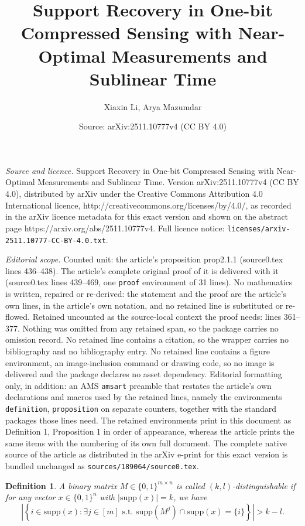 \documentclass[10pt,a4paper]{amsart}
\title{Support Recovery in One-bit Compressed Sensing with Near-Optimal Measurements and Sublinear Time}
\author{Xiaxin Li, Arya Mazumdar}
\date{Source: arXiv:2511.10777v4 (CC BY 4.0)}
\newtheorem{definition}{Definition}
\newcommand{\supp}{\mathrm{supp}}
\begin{document}
\maketitle

\noindent\emph{Source and licence.} Support Recovery in One-bit Compressed Sensing with Near-Optimal Measurements and Sublinear Time. Version arXiv:2511.10777v4 (CC BY 4.0), distributed by arXiv under the Creative Commons Attribution 4.0 International licence, http://creativecommons.org/licenses/by/4.0/, as recorded in the arXiv licence metadata for this exact version and shown on the abstract page https://arxiv.org/abs/2511.10777v4. Full licence notice: \texttt{licenses/arxiv-2511.10777-CC-BY-4.0.txt}.\par\smallskip

\noindent\textit{Editorial scope.} Counted unit: the article's proposition prop2.1.1 (source0.tex lines 436--438). The article's complete original proof of it is delivered with it (source0.tex lines 439--469, one \texttt{proof} environment of 31 lines). No mathematics is written, repaired or re-derived: the statement and the proof are the article's own lines, in the article's own notation, and no retained line is substituted or re-flowed.  Retained uncounted as the source-local context the proof needs: lines 361--377.  Nothing was omitted from any retained span, so the package carries no omission record.  No retained line contains a citation, so the wrapper carries no bibliography and no bibliography entry.  No retained line contains a figure environment, an image-inclusion command or drawing code, so no image is delivered and the package declares no asset dependency.  Editorial formatting only, in addition: an AMS \texttt{amsart} preamble that restates the article's own declarations and macros used by the retained lines, namely the environments \texttt{definition}, \texttt{proposition} on separate counters, together with the standard packages those lines need.  The retained environments print in this document as Definition 1, Proposition 1 in order of appearance, whereas the article prints the same items with the numbering of its own full document.  The complete native source of the article as distributed in the arXiv e-print for this exact version is bundled unchanged as \texttt{sources/189064/source0.tex}.
\begin{definition}\label{def:kld}
A binary matrix $M \in \{0,1\}^{m \times n}$ is called $(k,l)$-\emph{distinguishable} if for any vector $x \in \{0,1\}^n$ with $|\supp(x)| = k$, we have
\[
\left| \left\{ i \in \supp(x) : \exists j \in [m] \text{ s.t. } \supp(M^j) \cap \supp(x) = \{i\} \right\} \right| > k - l.
\]


\end{definition}
\end{document}
